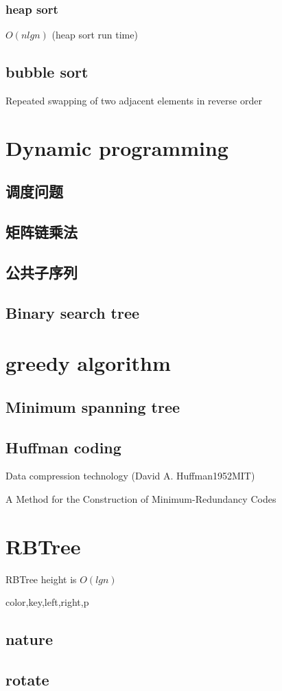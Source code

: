 \documentclass[oneside,12pt,twiside,a4paper]{ctexbook}
\begin{document}
\subsection{heap sort}
$O(nlgn)$ (heap sort run time)

%
\section{bubble sort}
Repeated swapping of two adjacent elements in reverse order


\chapter{Dynamic programming}
\section{调度问题}
\section{矩阵链乘法}
\section{公共子序列}
\section{Binary search tree}

%
\chapter{greedy algorithm}
\section{Minimum spanning tree}
\section{Huffman coding}
Data compression technology (David A. Huffman1952MIT)

A Method for the Construction of Minimum-Redundancy Codes

%
\chapter{RBTree}
RBTree height is $O(lgn)$

color,key,left,right,p

\section{nature}

\section{rotate}
\end{document}
